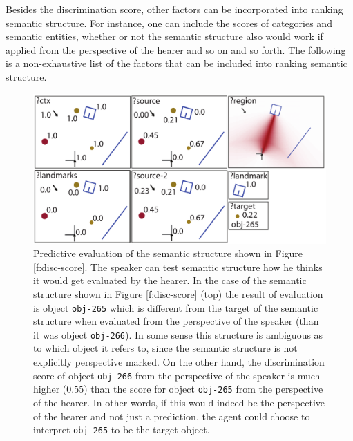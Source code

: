 Besides the discrimination score, other factors can be incorporated
into ranking semantic structure. For instance, one can include
the scores of categories and semantic entities, whether or not 
the semantic structure also would work if applied from the perspective
of the hearer and so on and so forth. The following is a non-exhaustive
list of the factors that can be included into ranking semantic
structure.

\begin{figure}
\begin{center}
\includegraphics[width=1\columnwidth]{figs/semantic-structure-in-front-of-the-box-relative-evaluation-prediction-hearer}
\end{center}
\caption[Predictive evaluation from the perspective of the hearer]
{Predictive evaluation of the semantic structure shown in Figure
\ref{f:disc-score}. The speaker can test semantic structure how he thinks it 
would get evaluated by the hearer. In the case of the semantic structure shown
in Figure \ref{f:disc-score} (top) the result of evaluation is object {\footnotesize\tt obj-265}
which is different from the target of the semantic structure when evaluated
from the perspective of the speaker (than it was object {\footnotesize\tt obj-266}).
In some sense this structure is ambiguous as to which object it refers to,
since the semantic structure is not explicitly perspective marked.
On the other hand, the discrimination score of object {\footnotesize\tt obj-266} 
from the perspective of the
speaker is much higher ($0.55$) than the score for object {\footnotesize\tt obj-265} 
from the perspective of the hearer. In other words, if this would indeed be
the perspective of the hearer and not just a prediction, the agent could
choose to interpret {\footnotesize\tt obj-265} to be the target object.}
\label{f:predictiv-evaluation}
\end{figure}

